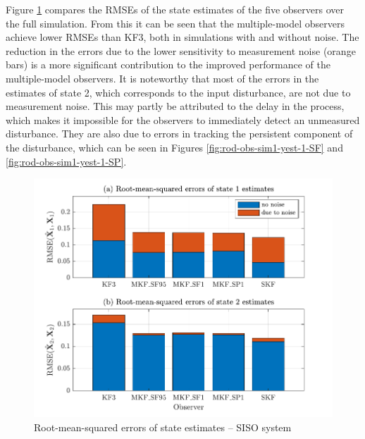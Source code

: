 Figure \ref{fig:rod-obs-sim1-xest-RMSE-bar} compares the \gls{RMSE}s of the state estimates of the five observers over the full simulation. From this it can be seen that the multiple-model observers achieve lower RMSEs than KF3, both in simulations with and without noise. The reduction in the errors due to the lower sensitivity to measurement noise (orange bars) is a more significant contribution to the improved performance of the multiple-model observers. It is noteworthy that most of the errors in the estimates of state 2, which corresponds to the input disturbance, are not due to measurement noise. This may partly be attributed to the delay in the process, which makes it impossible for the observers to immediately detect an unmeasured disturbance. They are also due to errors in tracking the persistent component of the disturbance, which can be seen in Figures \ref{fig:rod-obs-sim1-yest-1-SF} and \ref{fig:rod-obs-sim1-yest-1-SP}.
\begin{figure}[htp]
	\centering
	\includegraphics[width=12cm]{images/rod_obs_sim1_all_seed_x_err_bar.pdf}
	\caption{Root-mean-squared errors of state estimates – SISO system}
	\label{fig:rod-obs-sim1-xest-RMSE-bar}
\end{figure}

